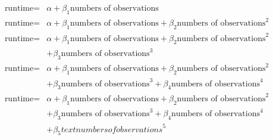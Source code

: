 \begin{align*}
    \text{runtime} = &\alpha + \beta_1 \text{numbers of observations} \\
    \text{runtime} = &\alpha + \beta_1 \text{numbers of observations} + \beta_2 \text{numbers of observations}^2 \\
    \text{runtime} = &\alpha + \beta_1 \text{numbers of observations} + \beta_2 \text{numbers of observations}^2 \\ 
                     &+ \beta_3\text{numbers of observations}^3 \\
    \text{runtime} = &\alpha + \beta_1 \text{numbers of observations} + \beta_2 \text{numbers of observations}^2 \\
                     &+ \beta_3\text{numbers of observations}^3 + \beta_4\text{numbers of observations}^4 \\
    \text{runtime} = &\alpha + \beta_1 \text{numbers of observations} + \beta_2 \text{numbers of observations}^2 \\
                     &+ \beta_3\text{numbers of observations}^3 + \beta_4\text{numbers of observations}^4 \\
                     &+ \beta_5text{numbers of observations}^5
\end{align*}